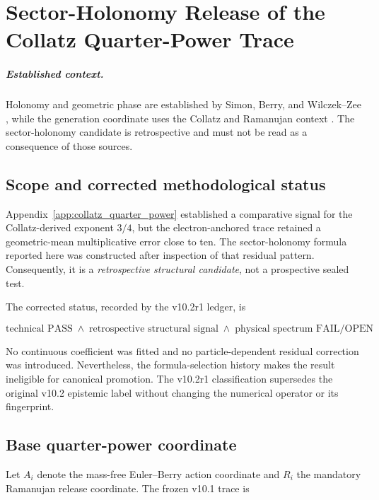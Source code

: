 \chapter[Sector-Holonomy Release]{Sector-Holonomy Release of the Collatz Quarter-Power Trace}
\label{app:sector_holonomy_release}


\paragraph{Established context.}
Holonomy and geometric phase are established by Simon, Berry, and Wilczek--Zee
\cite{Simon1983,berry1984,WilczekZee1984}, while the generation coordinate uses
the Collatz and Ramanujan context
\cite{Lagarias1985,Tao2022Collatz,Ramanujan1918}.  The sector-holonomy candidate
is retrospective and must not be read as a consequence of those sources.

\section{Scope and corrected methodological status}

Appendix~\ref{app:collatz_quarter_power} established a comparative signal for
the Collatz-derived exponent $3/4$, but the electron-anchored trace retained a
geometric-mean multiplicative error close to ten.  The sector-holonomy formula
reported here was constructed after inspection of that residual pattern.
Consequently, it is a \emph{retrospective structural candidate}, not a
prospective sealed test.

The corrected status, recorded by the v10.2r1 ledger, is

\[
\boxed{
\text{technical PASS}
\;\land\;
\text{retrospective structural signal}
\;\land\;
\text{physical spectrum FAIL/OPEN}
}
\]

No continuous coefficient was fitted and no particle-dependent residual
correction was introduced.  Nevertheless, the formula-selection history makes
the result ineligible for canonical promotion.  The v10.2r1 classification
supersedes the original v10.2 epistemic label without changing the numerical
operator or its fingerprint.

\section{Base quarter-power coordinate}

Let $A_i$ denote the mass-free Euler--Berry action coordinate and $R_i$ the
mandatory Ramanujan release coordinate.  The frozen v10.1 trace is

